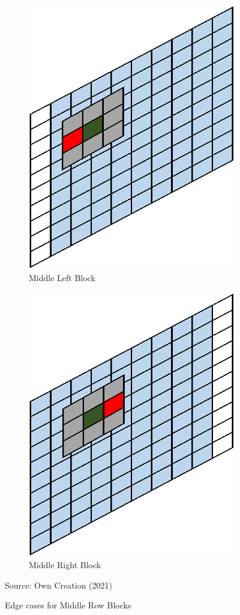\begin{figure}[H]
\centering
\begin{subfigure}{.5\textwidth}
  \centering
  \includegraphics[width=.5\linewidth]{Figures/Chapter3/midleft}
  \caption{Middle Left Block}
\end{subfigure}%
\begin{subfigure}{.5\textwidth}
  \centering
  \includegraphics[width=.5\linewidth]{Figures/Chapter3/midright}
  \caption{Middle Right Block}
\end{subfigure}
\caption{Edge cases for Middle Row Blocks}
\begin{center}
Source: Own Creation (2021)
\end{center}
\end{figure}

